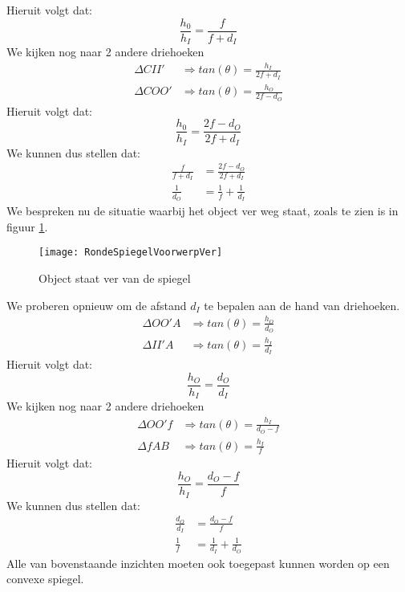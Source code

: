 \documentclass[a4paper,kul]{kulakarticle} %
\begin{document}
Hieruit volgt dat:
\begin{equation*}
	\frac{h_0}{h_I}=\frac{f}{f+d_I}
\end{equation*}
We kijken nog naar 2 andere driehoeken
\begin{align*}
	\Delta CII'&\Rightarrow tan(\theta)= \frac{h_I}{2f+d_I}\\
	\Delta COO'&\Rightarrow tan(\theta)= \frac{h_O}{2f-d_O}
\end{align*}
Hieruit volgt dat:
\begin{equation*}
	\frac{h_0}{h_I}=\frac{2f-d_O}{2f+d_I}
\end{equation*}
We kunnen dus stellen dat:
\begin{align*}
	\frac{f}{f+d_I}&=\frac{2f-d_O}{2f+d_I}\\
	\frac{1}{d_O} &= \frac{1}{f}+\frac{1}{d_I}
\end{align*}
\newpage
We bespreken nu de situatie waarbij het object ver weg staat, zoals te zien is in figuur \ref{fig:rondespiegelvoorwerpver}.
\begin{figure}[h]
	\centering
	\texttt{[image: RondeSpiegelVoorwerpVer]}
	\caption[Spiegel ver]{Object staat ver van de spiegel}
	\label{fig:rondespiegelvoorwerpver}
\end{figure}
We proberen opnieuw om de afstand $d_I$ te bepalen aan de hand van driehoeken.
\begin{align*}
	\Delta OO'A&\Rightarrow tan(\theta)=\frac{h_O}{d_O}\\
	\Delta II'A&\Rightarrow tan(\theta)= \frac{h_I}{d_I}
\end{align*}
Hieruit volgt dat:
\begin{equation*}
	\frac{h_O}{h_I}=\frac{d_O}{d_I}
\end{equation*}
We kijken nog naar 2 andere driehoeken
\begin{align*}
	\Delta OO'f&\Rightarrow tan(\theta)=\frac{h_I}{d_O-f}\\
	\Delta fAB&\Rightarrow tan(\theta)= \frac{h_I}{f}
\end{align*}
Hieruit volgt dat:
\begin{equation*}
	\frac{h_O}{h_I}=\frac{d_O-f}{f}
\end{equation*}
We kunnen dus stellen dat:
\begin{align*}
	\frac{d_O}{d_I}&=\frac{d_O-f}{f}\\
	\frac{1}{f}&= \frac{1}{d_I}+\frac{1}{d_O}
\end{align*}
Alle van bovenstaande inzichten moeten ook toegepast kunnen worden op een convexe spiegel. 
\newpage
\end{document}

